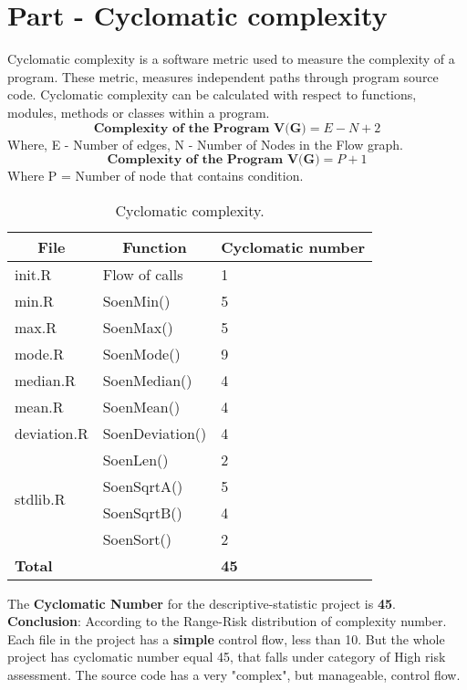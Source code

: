 \documentclass[12pt]{article}
\begin{document}
\section{Part - Cyclomatic complexity}
Cyclomatic complexity is a software metric used to measure the complexity of a program. These metric, measures independent paths through program source code. Cyclomatic complexity can be calculated with respect to functions, modules, methods or classes within a program.
\begin{equation}
    \textbf{Complexity of the Program V(G)} = E - N + 2
\end{equation}
Where, E - Number of edges, N - Number of Nodes in the Flow graph.
\begin{equation}
    \textbf{Complexity of the Program V(G)} = P + 1 
\end{equation}
Where P = Number of node that contains condition.\cite{CN}
\begin{table}[h]
\centering
\begin{tabular}{|l|l|l|}
\hline
\multicolumn{1}{|c|}{\textbf{File}} & \multicolumn{1}{c|}{\textbf{Function}} & \multicolumn{1}{c|}{\textbf{Cyclomatic number}} \\ \hline
init.R & Flow of calls & 1 \\ \hline
min.R & SoenMin() & 5 \\ \hline
max.R & SoenMax() & 5 \\ \hline
mode.R & SoenMode() & 9 \\ \hline
median.R & SoenMedian() & 4 \\ \hline
mean.R & SoenMean() & 4 \\ \hline
deviation.R & SoenDeviation() & 4 \\ \hline
\multirow{4}{*}{stdlib.R} & SoenLen() & 2 \\ \cline{2-3} 
 & SoenSqrtA() & 5 \\ \cline{2-3} 
 & SoenSqrtB() & 4 \\ \cline{2-3} 
 & SoenSort() & 2 \\ \hline
\textbf{Total} & \textbf{} & \textbf{45} \\ \hline
\end{tabular}
\caption{Cyclomatic complexity.}
\label{my-label}
\end{table}

The \textbf{Cyclomatic Number} for the descriptive-statistic project is \textbf{45}.\\

\textbf{Conclusion}: According to the Range-Risk distribution of complexity number. Each file in the project has a \textbf{simple} control flow, less than 10. But the whole project has cyclomatic number equal 45, that falls under category of High risk assessment. The source code has a very "complex", but manageable, control flow. 
\newpage
\end{document}
